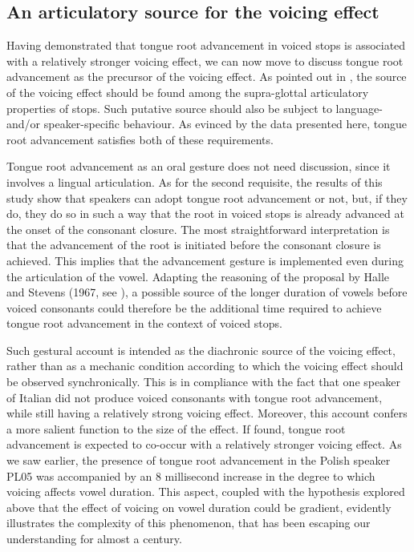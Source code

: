 \documentclass[authoryear, twocolumn]{elsarticle}
\begin{document}
\subsection{An articulatory source for the voicing
effect}\label{an-articulatory-source-for-the-voicing-effect}

Having demonstrated that tongue root advancement in voiced stops is
associated with a relatively stronger voicing effect, we can now move to
discuss tongue root advancement as the precursor of the voicing effect.
As pointed out in , the source of the voicing effect
should be found among the supra-glottal articulatory properties of
stops. Such putative source should also be subject to language- and/or
speaker-specific behaviour. As evinced by the data presented here,
tongue root advancement satisfies both of these requirements.

Tongue root advancement as an oral gesture does not need discussion,
since it involves a lingual articulation. As for the second requisite,
the results of this study show that speakers can adopt tongue root
advancement or not, but, if they do, they do so in such a way that the
root in voiced stops is already advanced at the onset of the consonant
closure. The most straightforward interpretation is that the advancement
of the root is initiated before the consonant closure is achieved. This
implies that the advancement gesture is implemented even during the
articulation of the vowel. Adapting the reasoning of the proposal by
Halle and Stevens (1967, see ), a possible source of the
longer duration of vowels before voiced consonants could therefore be
the additional time required to achieve tongue root advancement in the
context of voiced stops.

Such gestural account is intended as the diachronic source of the
voicing effect, rather than as a mechanic condition according to which
the voicing effect should be observed synchronically. This is in
compliance with the fact that one speaker of Italian did not produce
voiced consonants with tongue root advancement, while still having a
relatively strong voicing effect. Moreover, this account confers a more
salient function to the size of the effect. If found, tongue root
advancement is expected to co-occur with a relatively stronger voicing
effect. As we saw earlier, the presence of tongue root advancement in
the Polish speaker PL05 was accompanied by an 8 millisecond increase in
the degree to which voicing affects vowel duration. This aspect, coupled
with the hypothesis explored above that the effect of voicing on vowel
duration could be gradient, evidently illustrates the complexity of this
phenomenon, that has been escaping our understanding for almost a
century.
\end{document}
